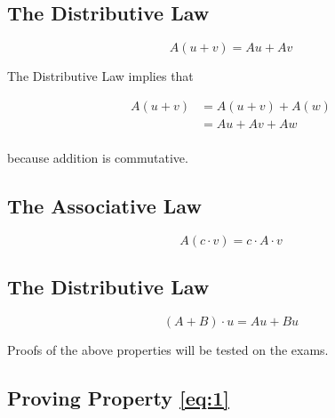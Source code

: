 \documentclass[12pt]{article}
\begin{document}
\subsection{The Distributive Law}

\begin{figure}[h!]
  \begin{equation}
    A(u+v) = Au + Av
    \label{eq:1}
  \end{equation}
\end{figure}

The Distributive Law implies that

\begin{align*}
  A(u+v) &= A(u+v) + A(w) \\
         &= Au + Av + Aw \\
\end{align*}

because addition is commutative.

\subsection{The Associative Law}

\begin{equation}
  A(c \cdot v) = c \cdot A \cdot v
\end{equation}

\subsection{The Distributive Law}

\begin{equation}
  (A+B)\cdot u = Au + Bu
\end{equation}

Proofs of the above properties will be tested on the exams.

\subsection{Proving Property \ref{eq:1}}



\end{document}
